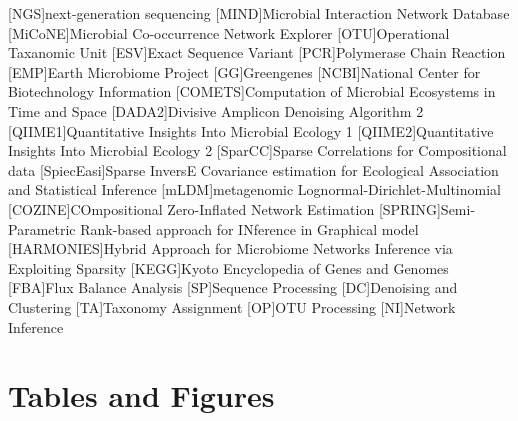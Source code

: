\documentclass[letterpaper,12pt]{article}
\providecommand{\DIFaddbegin}{} %
\providecommand{\DIFaddend}{} %
\providecommand{\DIFdelbegin}{} %
\providecommand{\DIFdelend}{} %
\newcommand{\DIFscaledelfig}{0.5}
\newlength{\DIFdelgraphicswidth} %
\newlength{\DIFdelgraphicsheight} %
\newcommand{\DIFaddincludegraphics}[2][]{{\color{blue}\fbox{\DIFOincludegraphics[#1]{#2}}}} %
\newcommand{\DIFdelincludegraphics}[2][]{%
\sbox{\DIFdelgraphicsbox}{\DIFOincludegraphics[#1]{#2}}%
\settoboxwidth{\DIFdelgraphicswidth}{\DIFdelgraphicsbox} %
\settoboxtotalheight{\DIFdelgraphicsheight}{\DIFdelgraphicsbox} %
\scalebox{\DIFscaledelfig}{%
\parbox[b]{\DIFdelgraphicswidth}{\usebox{\DIFdelgraphicsbox}\\[-\baselineskip] \rule{\DIFdelgraphicswidth}{0em}}\llap{\resizebox{\DIFdelgraphicswidth}{\DIFdelgraphicsheight}{%
\setlength{\unitlength}{\DIFdelgraphicswidth}%
\begin{picture}(1,1)%
\thicklines\linethickness{2pt} %
{\color[rgb]{1,0,0}\put(0,0){\framebox(1,1){}}}%
{\color[rgb]{1,0,0}\put(0,0){\line( 1,1){1}}}%
{\color[rgb]{1,0,0}\put(0,1){\line(1,-1){1}}}%
\end{picture}%
}\hspace*{3pt}}} %
} %
\DeclareRobustCommand{\DIFaddbegin}{\DIFOaddbegin \let\includegraphics\DIFaddincludegraphics} %
\DeclareRobustCommand{\DIFaddend}{\DIFOaddend \let\includegraphics\DIFOincludegraphics} %
\DeclareRobustCommand{\DIFdelbegin}{\DIFOdelbegin \let\includegraphics\DIFdelincludegraphics} %
\DeclareRobustCommand{\DIFdelend}{\DIFOaddend \let\includegraphics\DIFOincludegraphics} %
\begin{document}
\begin{acronym}[XXXXXXXX]
    [NGS]{next-generation sequencing}
    [MIND]{Microbial Interaction Network Database}
    [MiCoNE]{Microbial Co-occurrence Network Explorer}
    [OTU]{Operational Taxanomic Unit}
    [ESV]{Exact Sequence Variant}
    [PCR]{Polymerase Chain Reaction}
    [EMP]{Earth Microbiome Project}
    [GG]{Greengenes}
    [NCBI]{National Center for Biotechnology Information}
    [COMETS]{Computation of Microbial Ecosystems in Time and Space}
    [DADA2]{Divisive Amplicon Denoising Algorithm 2}
    [QIIME1]{Quantitative Insights Into Microbial Ecology 1}
    [QIIME2]{Quantitative Insights Into Microbial Ecology 2}
    [SparCC]{Sparse Correlations for Compositional data}
    [SpiecEasi]{Sparse InversE Covariance estimation for Ecological Association and Statistical Inference}
    [mLDM]{metagenomic Lognormal-Dirichlet-Multinomial}
    \DIFdelbegin %
\DIFdelend \DIFaddbegin {}[COZINE]{COmpositional Zero-Inflated Network Estimation}
    [SPRING]{Semi-Parametric Rank-based approach for INference in Graphical model}
    [HARMONIES]{Hybrid Approach for Microbiome Networks Inference via Exploiting Sparsity}
    \DIFaddend {}[KEGG]{Kyoto Encyclopedia of Genes and Genomes}
    [FBA]{Flux Balance Analysis}
    \DIFaddbegin {}[SP]{Sequence Processing}
    \DIFaddend {}[DC]{Denoising and Clustering}
    [TA]{Taxonomy Assignment}
    [OP]{OTU Processing}
    [NI]{Network Inference}
\end{acronym}


\newpage
\section*{Tables and Figures}

\end{document}
